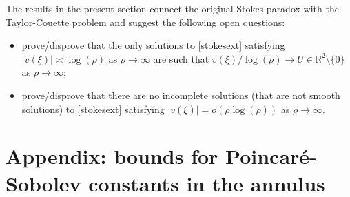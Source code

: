 \documentclass[a4paper,11pt]{article}
\numberwithin{equation}{section}
\numberwithin{figure}{section}
\newcommand{\R}{\mathbb{R}}
\begin{document}
The results in the present section connect the original Stokes paradox with the Taylor-Couette problem and suggest the following open questions:
\begin{itemize}
\item[(I)] prove/disprove that the only solutions to \eqref{stokesext} satisfying $|v(\xi)|\asymp\log(\rho)$ as $\rho\to\infty$ are such that $v(\xi)/\log(\rho) \to U\in\R^2\setminus\{0\}$ as $\rho\to\infty$;
\item[(II)] prove/disprove that there are no incomplete solutions (that are not smooth solutions) to \eqref{stokesext} satisfying $|v(\xi)|=o(\rho\log(\rho))$ as $\rho\to\infty$.
\end{itemize}

\appendix
\section{Appendix: bounds for Poincaré-Sobolev constants in the annulus}\label{bondsSob}
\end{document}
